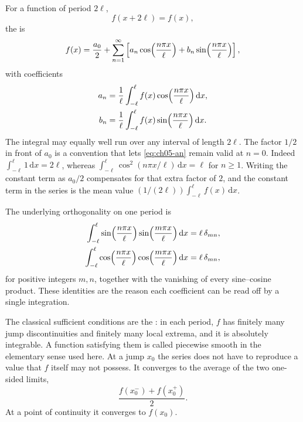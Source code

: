 For a function of period $2\ell$,
\begin{equation}
f(x+2\ell)=f(x),
\end{equation}
the  is
\begin{equation}
f(x)=\frac{a_0}{2}+\sum_{n=1}^{\infty}
\left[
a_n\cos\Bigl(\frac{n\pi x}{\ell}\Bigr)
+b_n\sin\Bigl(\frac{n\pi x}{\ell}\Bigr)
\right],
\label{eq:ch05-fourier-series}
\end{equation}
with coefficients
\begin{align}
a_n&=\frac{1}{\ell}\int_{-\ell}^{\ell}f(x)\cos\Bigl(\frac{n\pi x}{\ell}\Bigr)\,\mathrm{d}x,
\label{eq:ch05-an}\\
b_n&=\frac{1}{\ell}\int_{-\ell}^{\ell}f(x)\sin\Bigl(\frac{n\pi x}{\ell}\Bigr)\,\mathrm{d}x.
\label{eq:ch05-bn}
\end{align}
The integral may equally well run over any interval of length $2\ell$. The factor $1/2$ in front of $a_0$ is a convention that lets \eqref{eq:ch05-an} remain valid at $n=0$. Indeed $\int_{-\ell}^{\ell}1\,\mathrm{d}x=2\ell$, whereas $\int_{-\ell}^{\ell}\cos^2(n\pi x/\ell)\,\mathrm{d}x=\ell$ for $n\geq 1$. Writing the constant term as $a_0/2$ compensates for that extra factor of $2$, and the constant term in the series is the mean value $(1/(2\ell))\int_{-\ell}^{\ell}f(x)\,\mathrm{d}x$.

The underlying orthogonality on one period is
\begin{align}
\int_{-\ell}^{\ell}\sin\Bigl(\frac{n\pi x}{\ell}\Bigr)\sin\Bigl(\frac{m\pi x}{\ell}\Bigr)\,\mathrm{d}x
&=\ell\,\delta_{mn},\\
\int_{-\ell}^{\ell}\cos\Bigl(\frac{n\pi x}{\ell}\Bigr)\cos\Bigl(\frac{m\pi x}{\ell}\Bigr)\,\mathrm{d}x
&=\ell\,\delta_{mn},
\end{align}
for positive integers $m,n$, together with the vanishing of every sine--cosine product. These identities are the reason each coefficient can be read off by a single integration.

The classical sufficient conditions are the : in each period, $f$ has finitely many jump discontinuities and finitely many local extrema, and it is absolutely integrable. A function satisfying them is called piecewise smooth in the elementary sense used here. At a jump $x_0$ the series does not have to reproduce a value that $f$ itself may not possess. It converges to the average of the two one-sided limits,
\begin{equation}
\frac{f(x_0^-)+f(x_0^+)}{2}.
\label{eq:ch05-jump}
\end{equation}
At a point of continuity it converges to $f(x_0)$.

